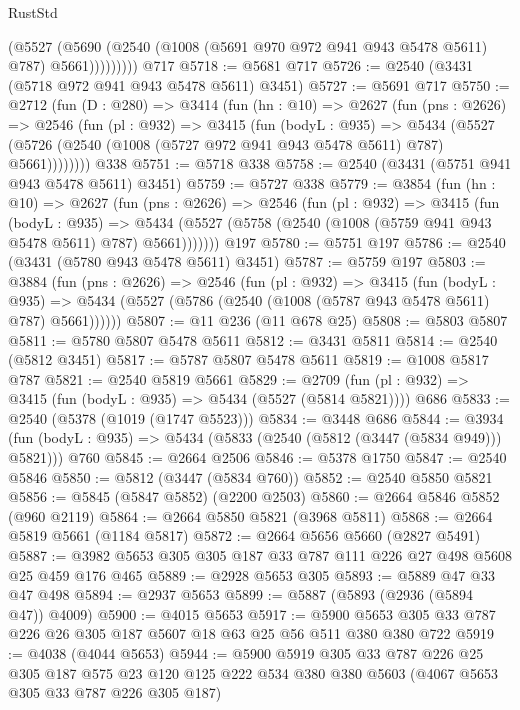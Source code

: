 \begin{lexlean}{RustStd}
\begin{coremodule}
                (@5527
                  (@5690 (@2540 (@1008 (@5691 @970 @972 @941 @943 @5478 @5611) @787) @5661)))))))))
    @717
@5718 := @5681 @717
@5726 := @2540 (@3431 (@5718 @972 @941 @943 @5478 @5611) @3451)
@5727 := @5691 @717
@5750 := @2712
    (fun (D : @280) =>
    @3414
      (fun (hn : @10) =>
      @2627
        (fun (pns : @2626) =>
        @2546
          (fun (pl : @932) =>
          @3415
            (fun (bodyL : @935) =>
            @5434 (@5527 (@5726 (@2540 (@1008 (@5727 @972 @941 @943 @5478 @5611) @787) @5661))))))))
    @338
@5751 := @5718 @338
@5758 := @2540 (@3431 (@5751 @941 @943 @5478 @5611) @3451)
@5759 := @5727 @338
@5779 := @3854
    (fun (hn : @10) =>
    @2627
      (fun (pns : @2626) =>
      @2546
        (fun (pl : @932) =>
        @3415
          (fun (bodyL : @935) =>
          @5434 (@5527 (@5758 (@2540 (@1008 (@5759 @941 @943 @5478 @5611) @787) @5661)))))))
    @197
@5780 := @5751 @197
@5786 := @2540 (@3431 (@5780 @943 @5478 @5611) @3451)
@5787 := @5759 @197
@5803 := @3884
    (fun (pns : @2626) =>
    @2546
      (fun (pl : @932) =>
      @3415
        (fun (bodyL : @935) =>
        @5434 (@5527 (@5786 (@2540 (@1008 (@5787 @943 @5478 @5611) @787) @5661))))))
@5807 := @11 @236 (@11 @678 @25)
@5808 := @5803 @5807
@5811 := @5780 @5807 @5478 @5611
@5812 := @3431 @5811
@5814 := @2540 (@5812 @3451)
@5817 := @5787 @5807 @5478 @5611
@5819 := @1008 @5817 @787
@5821 := @2540 @5819 @5661
@5829 := @2709 (fun (pl : @932) => @3415 (fun (bodyL : @935) => @5434 (@5527 (@5814 @5821)))) @686
@5833 := @2540 (@5378 (@1019 (@1747 @5523)))
@5834 := @3448 @686
@5844 := @3934 (fun (bodyL : @935) => @5434 (@5833 (@2540 (@5812 (@3447 (@5834 @949))) @5821))) @760
@5845 := @2664 @2506
@5846 := @5378 @1750
@5847 := @2540 @5846
@5850 := @5812 (@3447 (@5834 @760))
@5852 := @2540 @5850 @5821
@5856 := @5845 (@5847 @5852) (@2200 @2503)
@5860 := @2664 @5846 @5852 (@960 @2119)
@5864 := @2664 @5850 @5821 (@3968 @5811)
@5868 := @2664 @5819 @5661 (@1184 @5817)
@5872 := @2664 @5656 @5660 (@2827 @5491)
@5887 := @3982 @5653 @305 @305 @187 @33 @787 @111 @226 @27 @498 @5608 @25 @459 @176 @465
@5889 := @2928 @5653 @305
@5893 := @5889 @47 @33 @47 @498
@5894 := @2937 @5653
@5899 := @5887 (@5893 (@2936 (@5894 @47)) @4009)
@5900 := @4015 @5653
@5917 := @5900 @5653 @305 @33 @787 @226 @26 @305 @187 @5607 @18 @63 @25 @56 @511 @380 @380 @722
@5919 := @4038 (@4044 @5653)
@5944 := @5900
    @5919
    @305
    @33
    @787
    @226
    @25
    @305
    @187
    @575
    @23
    @120
    @125
    @222
    @534
    @380
    @380
    @5603
    (@4067 @5653 @305 @33 @787 @226 @305 @187)

\end{coremodule}
\end{lexlean}
